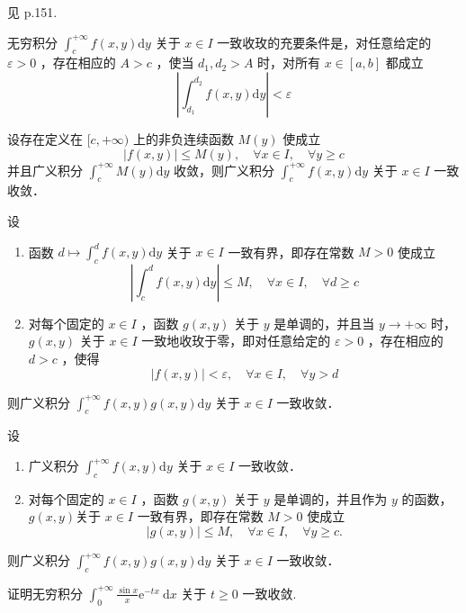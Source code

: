 见\cite{崔尚斌} p.151.
\begin{theorem}[一致收敛的柯西准则]
    无穷积分 $\int_c^{+\infty} f(x, y) \mathrm{d} y$ 关于 $x \in I$ 一致收玫的充要条件是，对任意给定的 $\varepsilon>0$ ，存在相应的 $A>c$ ，使当 $d_1, d_2>A$ 时，对所有 $x \in[a, b]$ 都成立
$$
\left|\int_{d_1}^{d_2} f(x, y) \mathrm{d} y\right|<\varepsilon
$$
\end{theorem}
\begin{theorem}
    设存在定义在 $[c,+\infty)$ 上的非负连续函数 $M(y)$ 使成立
$$
|f(x, y)| \leqslant M(y), \quad \forall x \in I, \quad \forall y \geqslant c
$$
并且广义积分 $\int_c^{+\infty} M(y) \mathrm{d} y$ 收敛，则广义积分 $\int_c^{+\infty} f(x, y) \mathrm{d} y$ 关于 $x \in I$ 一致收敛．
\end{theorem}
\begin{theorem}[狄利克雷判别法]
    设
    \begin{enumerate}
        \item 函数 $d \mapsto \int_c^d f(x, y) \mathrm{d} y$ 关于 $x \in I$ 一致有界，即存在常数 $M>0$ 使成立
$$
\left|\int_c^d f(x, y) \mathrm{d} y\right| \leqslant M, \quad \forall x \in I, \quad \forall d \geqslant c
$$
        \item 对每个固定的 $x \in I$ ，函数 $g(x, y)$ 关于 $y$ 是单调的，并且当 $y \rightarrow+\infty$ 时， $g(x, y)$ 关于 $x \in I$ 一致地收玫于零，即对任意给定的 $\varepsilon>0$ ，存在相应的 $d>c$ ，使得
$$
|f(x, y)|<\varepsilon, \quad \forall x \in I, \quad \forall y>d
$$
    \end{enumerate}
则广义积分 $\int_c^{+\infty} f(x, y) g(x, y) \mathrm{d} y$ 关于 $x \in I$ 一致收敛．
\end{theorem}
\begin{theorem}[阿贝尔判别法]
    设
    \begin{enumerate}
        \item 广义积分 $\int_c^{+\infty} f(x, y) \mathrm{d} y$ 关于 $x \in I$ 一致收敛．
        \item 对每个固定的 $x \in I$ ，函数 $g(x, y)$ 关于 $y$ 是单调的，并且作为 $y$ 的函数，$g(x, y)$关于 $x \in I$ 一致有界，即存在常数 $M>0$ 使成立
$$
|g(x, y)| \leqslant M, \quad \forall x \in I, \quad \forall y \geqslant c .
$$
    \end{enumerate}
则广义积分 $\int_c^{+\infty} f(x, y) g(x, y) \mathrm{d} y$ 关于 $x \in I$ 一致收敛．
\end{theorem}

\begin{exercise}
    证明无穷积分 $\int_0^{+\infty} \frac{\sin x}{x} \mathrm{e}^{-t x} \mathrm{~d} x$ 关于 $t \geqslant 0$ 一致收敛.
\end{exercise}


